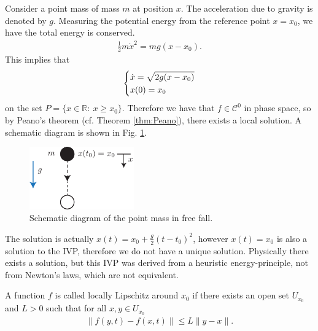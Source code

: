 \begin{ex}
	Consider a point mass of mass $m$ at position $x$. The acceleration due to gravity is denoted by $g$. Measuring the potential energy from the reference point $x=x_0$, we have the total energy is conserved.
	\begin{align}
		\frac{1}{2} m \dot{x}^2 = mg(x-x_0).
	\end{align}
This implies that
\begin{align}
	\begin{dcases}
		\dot{x} = \sqrt{2g(x-x_0)} \\
		x(0) = x_0
	\end{dcases}
\end{align}
on the set $P = \{ x \in \mathbb{R}:\ x \geq x_0\}$. Therefore we have that $f\in \mathcal{C}^0$ in phase space, so by Peano's theorem (cf. Theorem \ref{thm:Peano}), there exists a local solution. A schematic diagram is shown in Fig. \ref{fig:point_mass}. 
	\begin{figure}[h!]
		\centering
		\includegraphics[width=0.4\textwidth]{figures/ch1/1freefall.pdf}
		\caption{Schematic diagram of the point mass in free fall.}
		\label{fig:point_mass}
	\end{figure}
	The solution is actually $x(t) = x_0 + \frac{g}{2}(t-t_0)^2$, however $x(t) = x_0$ is also a solution to the IVP, therefore we do not have a unique solution. Physically there exists a solution, but this IVP was derived from a heuristic energy-principle, not from Newton's laws, which are not equivalent.
\end{ex}
\begin{definition}
A function $f$ is called locally Lipschitz around $ {x}_0$ if there exists an open set $U_{ {x}_0}$ and $L>0$ such that for all $ {x}, {y} \in U_{ {x}_0}$
\begin{align}
	\boxed{\left \| f( {y},t) - f( {x},t)\right \| \leq L  \| {y} -  {x} \|.}
\end{align}
\end{definition}

